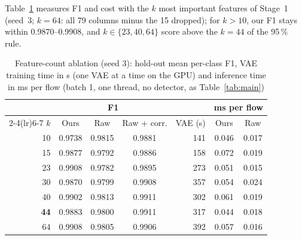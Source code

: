 Table~\ref{tab:featurecount} measures F1 and cost with the $k$ most important features of Stage~1 (seed~3; $k=64$: all 79 columns minus the 15 dropped); for $k>10$, our F1 stays within 0.9870--0.9908, and $k\in\{23, 40, 64\}$ score above the $k=44$ of the 95\,\% rule.

\begin{table}[t]
\caption{Feature-count ablation (seed 3): hold-out mean per-class F1, VAE training time in s (one VAE at a time on the GPU) and inference time in ms per flow (batch 1, one thread, no detector, as Table~\ref{tab:main})}\label{tab:featurecount}
\centering\scriptsize
\setlength{\tabcolsep}{3pt}
\begin{tabular}{rcccrcc}
\toprule
 & \multicolumn{3}{c}{F1} & & \multicolumn{2}{c}{ms per flow} \\
\cmidrule(lr){2-4}\cmidrule(lr){6-7}
$k$ & Ours & Raw & Raw + corr. & VAE (s) & Ours & Raw \\
\midrule
10 & 0.9738 & 0.9815 & 0.9881 & 141 & 0.046 & 0.017 \\
15 & 0.9877 & 0.9792 & 0.9886 & 158 & 0.072 & 0.019 \\
23 & 0.9908 & 0.9782 & 0.9895 & 273 & 0.051 & 0.015 \\
30 & 0.9870 & 0.9799 & 0.9908 & 357 & 0.054 & 0.024 \\
40 & 0.9902 & 0.9813 & 0.9911 & 302 & 0.061 & 0.019 \\
\textbf{44} & 0.9883 & 0.9800 & 0.9911 & 317 & 0.044 & 0.018 \\
64 & 0.9908 & 0.9805 & 0.9906 & 392 & 0.057 & 0.016 \\
\bottomrule
\end{tabular}
\end{table}
